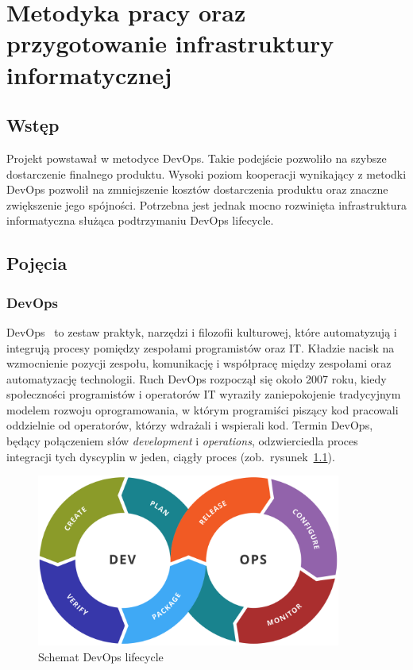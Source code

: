 
\chapter{Metodyka pracy oraz przygotowanie infrastruktury informatycznej}

\section{Wstęp}
Projekt powstawał w metodyce DevOps. Takie podejście pozwoliło na szybsze dostarczenie finalnego produktu. Wysoki poziom kooperacji wynikający z metodki DevOps pozwolił na zmniejszenie kosztów dostarczenia produktu oraz znaczne zwiększenie jego spójności. Potrzebna jest jednak mocno rozwinięta infrastruktura informatyczna służąca podtrzymaniu DevOps lifecycle.

\section{Pojęcia}
	\subsection{DevOps}
	DevOps~\cite{devops} to zestaw praktyk, narzędzi i filozofii kulturowej, które automatyzują i integrują procesy pomiędzy zespołami programistów oraz IT. Kładzie nacisk na wzmocnienie pozycji zespołu, komunikację i współpracę między zespołami oraz automatyzację technologii.
	Ruch DevOps rozpoczął się około 2007 roku, kiedy społeczności programistów i operatorów IT wyraziły zaniepokojenie tradycyjnym modelem rozwoju oprogramowania, w którym programiści piszący kod pracowali oddzielnie od operatorów, którzy wdrażali i wspierali kod. Termin DevOps, będący połączeniem słów \textit{development} i \textit{operations}, odzwierciedla proces integracji tych dyscyplin w jeden, ciągły proces (zob.~rysunek~\ref{rys:devops_lifecycle}).
\begin{figure}[H]
\centering\includegraphics[width=10cm]{figures/devops_lifecycle}
\caption{Schemat DevOps lifecycle~\cite{devops_lifecycle}}\label{rys:devops_lifecycle}
\end{figure}

